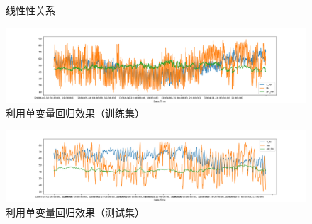 \documentclass{ctexart}
\begin{document}
\begin{figure}[H]
{	}
	\caption{线性性关系}	
\end{figure}
\begin{figure}[H]
	\includegraphics[width=1.2\textwidth]{../images/siganlpa.png}
	\caption{利用单变量回归效果（训练集）}
\end{figure}
\begin{figure}[H]
	\includegraphics[width=1.2\textwidth]{../images/st.png}
	\caption{利用单变量回归效果（测试集）}
\end{figure}
\end{document}
